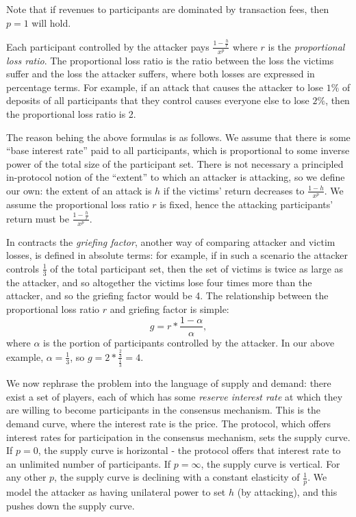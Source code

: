 \documentclass[12pt]{article}
\begin{document}
Note that if revenues to participants are dominated by transaction fees, then $p=1$ will hold.

Each participant controlled by the attacker pays $\frac{1-\frac{h}{r}}{x^p}$ where $r$ is the \textit{proportional loss ratio}. The proportional loss ratio is the ratio between the loss the victims suffer and the loss the attacker suffers, where both losses are expressed in percentage terms. For example, if an attack that causes the attacker to lose $1\%$ of deposits of all participants that they control causes everyone else to lose $2\%$, then the proportional loss ratio is 2.

The reason behing the above formulas is as follows. We assume that there is some ``base interest rate'' paid to all participants, which is proportional to some inverse power of the total size of the participant set. There is not necessary a principled in-protocol notion of the ``extent'' to which an attacker is attacking, so we define our own: the extent of an attack is $h$ if the victims' return decreases to $\frac{1-h}{x^p}$. We assume the proportional loss ratio $r$ is fixed, hence the attacking participants' return must be $\frac{1-\frac{h}{r}}{x^p}$.

In contracts the \textit{griefing factor}, another way of comparing attacker and victim losses, is defined in absolute terms: for example, if in such a scenario the attacker controls $\frac{1}{3}$ of the total participant set, then the set of victims is twice as large as the attacker, and so altogether the victims lose four times more than the attacker, and so the griefing factor would be 4. The relationship between the proportional loss ratio $r$ and griefing factor is simple: $$g = r * \frac{1-\alpha}{\alpha},$$ where $\alpha$ is the portion of participants controlled by the attacker. In our above example, $\alpha = \frac{1}{3}$, so $g = 2 * \frac{\frac{2}{3}}{\frac{1}{3}} = 4$.

We now rephrase the problem into the language of supply and demand: there exist a set of players, each of which has some \textit{reserve interest rate} at which they are willing to become participants in the consensus mechanism. This is the demand curve, where the interest rate is the price. The protocol, which offers interest rates for participation in the consensus mechanism, sets the supply curve. If $p=0$, the supply curve is horizontal - the protocol offers that interest rate to an unlimited number of participants. If $p=\infty$, the supply curve is vertical. For any other $p$, the supply curve is declining with a constant elasticity of $\frac{1}{p}$. We model the attacker as having unilateral power to set $h$ (by attacking), and this pushes down the supply curve.
\end{document}
